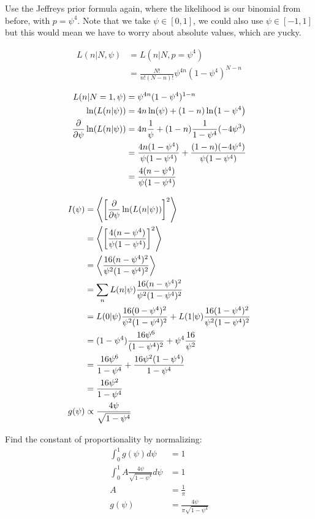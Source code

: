 \begin{enumerate}[label=\textbf{\Alph*}.]
    Use the Jeffreys prior formula again, where the likelihood is  our binomial from before, with $p = \psi^4$. Note that we take $\psi \in [0, 1]$, we could also use $\psi \in [-1, 1]$ but this would mean we have to worry about absolute values, which are yucky.

    \begin{align*}
        L(n|N, \psi) &= L(n|N, p=\psi^4) \\
        &= \frac{N!}{n!(N-n)!} \psi^{4n} (1-\psi^4)^{N-n} \\
    \end{align*}
    \begin{align*}
        L(n|N=1, \psi) &= \psi^{4n} (1-\psi^4)^{1-n} \\
        \ln(L(n|\psi)) &= 4n\ln(\psi) + (1-n)\ln(1-\psi^4) \\
        \frac{\partial}{\partial \psi} \ln(L(n|\psi)) &= 4n\frac{1}{\psi} + (1-n)\frac{1}{1-\psi^4}(-4\psi^3) \\
        &= \frac{4n(1-\psi^4)}{\psi(1-\psi^4)} + \frac{(1-n)(-4\psi^4)}{\psi(1-\psi^4)} \\
        &= \frac{4(n-\psi^4)}{\psi(1-\psi^4)} \\
    \end{align*}

    \begin{align*}
        I(\psi) &=  \left< \left[\frac{\partial}{\partial \psi} \ln(L(n|\psi))\right]^2 \right> \\
        &= \left< \left[\frac{4(n-\psi^4)}{\psi(1-\psi^4)}\right]^2 \right> \\
        &= \left< \frac{16(n-\psi^4)^2}{\psi^2(1-\psi^4)^2} \right> \\
        &= \sum_n L(n|\psi) \frac{16(n-\psi^4)^2}{\psi^2(1-\psi^4)^2} \\
        &= L(0|\psi) \frac{16(0-\psi^4)^2}{\psi^2(1-\psi^4)^2} + L(1|\psi) \frac{16(1-\psi^4)^2}{\psi^2(1-\psi^4)^2} \\
        &= (1-\psi^4) \frac{16\psi^6}{(1-\psi^4)^2} + \psi^4 \frac{16}{\psi^2} \\
        &= \frac{16\psi^6}{1-\psi^4} +  \frac{16\psi^2(1-\psi^4)}{1-\psi^4} \\
        &= \frac{16\psi^2}{1-\psi^4} \\
        g(\psi) &\propto \frac{4\psi}{\sqrt{1-\psi^4}} \\
    \end{align*}

    Find the constant of proportionality by normalizing:
    \begin{align*}
        \int_0^1 g(\psi)d\psi &= 1 \\
        \int_0^1 A \frac{4\psi}{\sqrt{1-\psi^4}} d\psi &= 1 \\
        A &= \frac{1}{\pi} \\
        g(\psi) &= \frac{4\psi}{\pi\sqrt{1-\psi^4}} \\
    \end{align*}


\end{enumerate}
